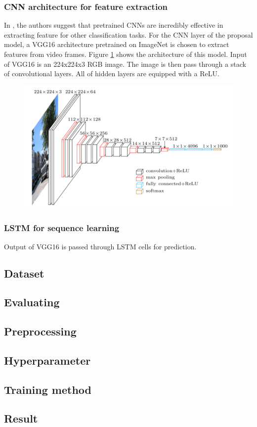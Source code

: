 \subsubsection{CNN architecture for feature extraction}
In \cite{DBLP:journals/corr/ZhouKLOT14}, the authors suggest that pretrained CNNs are incredibly effective in extracting feature for other classification tasks.
For the CNN layer of the proposal model, a VGG16 \cite{DBLP:journals/corr/SimonyanZ14a} architecture pretrained on ImageNet  is chosen to extract features from video frames. Figure \ref{chap3:vgg16_architecture} shows the architecture of this model. Input of VGG16 is an 224x224x3 RGB image. The image is then pass through a stack of convolutional layers. All of hidden layers are equipped with a ReLU.  
\begin{center}
    \begin{figure}[H]
    \centering
    \includegraphics[width=1\columnwidth]{images/chap3/vgg16_architecture.png}
    \footcaption{}
    \label{chap3:vgg16_architecture}
    \end{figure}
\end{center}
\subsubsection{LSTM for sequence learning}
Output of VGG16 is passed through LSTM cells for prediction.
\subsection{Dataset}
\subsection{Evaluating}
\subsection{Preprocessing}
\subsection{Hyperparameter}
\subsection{Training method}
\subsection{Result}





